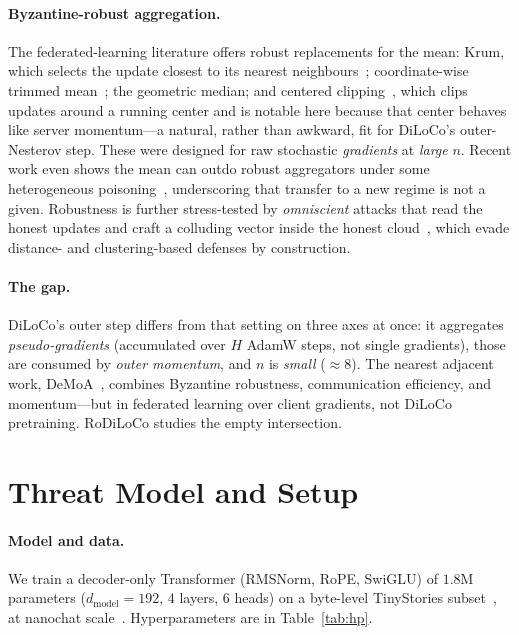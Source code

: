 \documentclass[11pt]{article}
\begin{document}
\paragraph{Byzantine-robust aggregation.}
The federated-learning literature offers robust replacements for the mean: Krum, which selects
the update closest to its nearest neighbours~\citep{krum2017}; coordinate-wise trimmed
mean~\citep{trimmedmean2018}; the geometric median; and centered
clipping~\citep{centeredclipping2021}, which clips updates around a running center and is
notable here because that center behaves like server momentum---a natural, rather than
awkward, fit for DiLoCo's outer-Nesterov step. These were designed for raw stochastic
\emph{gradients} at \emph{large} $n$. Recent work even shows the mean can outdo robust
aggregators under some heterogeneous poisoning~\citep{meanrobust2024}, underscoring that
transfer to a new regime is not a given. Robustness is further stress-tested by
\emph{omniscient} attacks that read the honest updates and craft a colluding vector inside
the honest cloud~\citep{alie2019,minmax2021}, which evade distance- and clustering-based
defenses by construction.

\paragraph{The gap.}
DiLoCo's outer step differs from that setting on three axes at once: it aggregates
\emph{pseudo-gradients} (accumulated over $H$ AdamW steps, not single gradients), those are
consumed by \emph{outer momentum}, and $n$ is \emph{small} ($\approx 8$). The nearest
adjacent work, DeMoA~\citep{demoa2025}, combines Byzantine robustness, communication
efficiency, and momentum---but in federated learning over client gradients, not DiLoCo
pretraining. RoDiLoCo studies the empty intersection.

\section{Threat Model and Setup}
\label{sec:setup}

\paragraph{Model and data.}
We train a decoder-only Transformer (RMSNorm, RoPE, SwiGLU) of $1.8$M parameters
($d_{\text{model}}{=}192$, $4$ layers, $6$ heads) on a byte-level TinyStories
subset~\citep{tinystories2023}, at nanochat scale~\citep{nanochatdiloco2025}. Hyperparameters
are in Table~\ref{tab:hp}.
\end{document}
